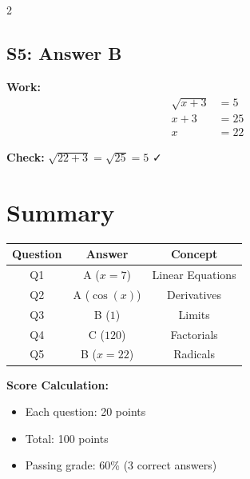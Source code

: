 \documentclass[12pt]{article}
\begin{document}
\begin{multicols}{2}
\subsection*{S5: Answer B}
\textbf{Work:}
\begin{align*}
    \sqrt{x + 3} &= 5 \\
    x + 3 &= 25 \\
    x &= 22
\end{align*}

\textbf{Check:} $\sqrt{22 + 3} = \sqrt{25} = 5$ ✓

\end{multicols}

\vspace{1em}

\section*{Summary}

\begin{center}
\begin{tabular}{|c|c|c|}
\hline
\textbf{Question} & \textbf{Answer} & \textbf{Concept} \\
\hline
Q1 & A ($x = 7$) & Linear Equations \\
Q2 & A ($\cos(x)$) & Derivatives \\
Q3 & B ($1$) & Limits \\
Q4 & C ($120$) & Factorials \\
Q5 & B ($x = 22$) & Radicals \\
\hline
\end{tabular}
\end{center}

\vspace{1em}

\textbf{Score Calculation:}
\begin{itemize}
    \item Each question: 20 points
    \item Total: 100 points
    \item Passing grade: 60\% (3 correct answers)
\end{itemize}
\end{document}
